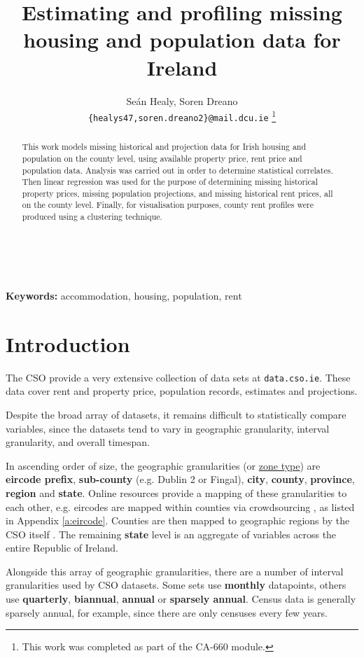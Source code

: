 \documentclass[twocolumn]{article}
\title{Estimating and profiling missing housing and population data for Ireland}
\author{
    Seán Healy, Soren Dreano\\
    \texttt{\{healys47,soren.dreano2\}@mail.dcu.ie}
    \footnote{This work was completed as part of the CA-660 module.}
}
\begin{document}
\maketitle
\begin{abstract}
This work models missing historical and projection data for Irish
housing and population on the county level, using available
property price, rent price and population data.  Analysis was
carried out in order to determine statistical correlates.  Then linear
regression was used for the purpose of determining missing historical property
prices, missing population projections, and missing historical rent prices,
all on the county level.  Finally, for visualisation purposes, county rent
profiles were produced using a clustering technique.
\end{abstract}\\\\
{\bf Keywords:} accommodation, housing, population, rent

\section{Introduction\label{s:intro}}
The CSO provide a very extensive collection of data sets at
{\tt data.cso.ie}.  These data cover rent and property price, population
records, estimates and projections.

Despite the broad array of datasets, it remains difficult to statistically
compare variables, since the datasets tend to vary in geographic granularity,
interval granularity, and overall timespan.

In ascending order of size, the geographic granularities (or \underline{zone type}) are {\bf eircode prefix},
{\bf sub-county} (e.g. Dublin 2 or Fingal), {\bf city}, {\bf county}, {\bf province}, {\bf region} and {\bf state}.  Online resources provide a mapping of
these granularities to each other, e.g. eircodes are mapped within counties via crowdsourcing
\cite{eircode19}, as listed in Appendix \ref{a:eircode}.  Counties are then mapped to geographic
regions by the CSO itself \cite{cso_regions}.  The remaining {\bf state} level is an aggregate of variables
across the entire Republic of Ireland.

Alongside this array of geographic granularities, there are a number of interval granularities used by CSO
datasets.  Some sets use {\bf monthly} datapoints, others use {\bf quarterly}, {\bf biannual}, {\bf annual}
or {\bf sparsely annual}.  Census data is generally sparsely annual, for example, since there are only
censuses every few years.
\end{document}
